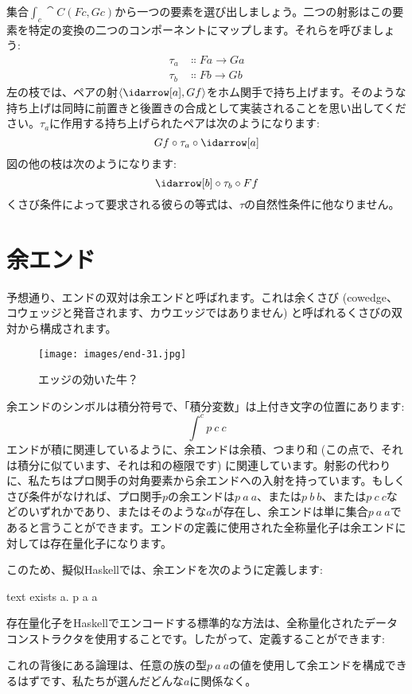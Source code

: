 \noindent
集合$\int_c \cat{C}(F c, G c)$から一つの要素を選び出しましょう。二つの射影はこの要素を特定の変換の二つのコンポーネントにマップします。それらを呼びましょう: 
\begin{align*}
  \tau_a & \Colon F a \to G a \\
  \tau_b & \Colon F b \to G b
\end{align*}
左の枝では、ペアの射$\langle \idarrow[a], G f \rangle$をホム関手で持ち上げます。そのような持ち上げは同時に前置きと後置きの合成として実装されることを思い出してください。$\tau_a$に作用する持ち上げられたペアは次のようになります: 
\[G f \circ \tau_a \circ \idarrow[a]\]
図の他の枝は次のようになります: 
\[\idarrow[b] \circ \tau_b \circ F f\]
くさび条件によって要求される彼らの等式は、$\tau$の自然性条件に他なりません。

\section{余エンド}
予想通り、エンドの双対は余エンドと呼ばれます。これは余くさび (cowedge、コウェッジと発音されます、カウエッジではありません) と呼ばれるくさびの双対から構成されます。

\begin{figure}[H]
  \centering
  \texttt{[image: images/end-31.jpg]}
  \caption{エッジの効いた牛？}
\end{figure}

\noindent
余エンドのシンボルは積分符号で、「積分変数」は上付き文字の位置にあります: 
\[\int^c p\ c\ c\]
エンドが積に関連しているように、余エンドは余積、つまり和 (この点で、それは積分に似ています、それは和の極限です) に関連しています。射影の代わりに、私たちはプロ関手の対角要素から余エンドへの入射を持っています。もしくさび条件がなければ、プロ関手$p$の余エンドは$p\ a\ a$、または$p\ b\ b$、または$p\ c\ c$などのいずれかであり、またはそのような$a$が存在し、余エンドは単に集合$p\ a\ a$であると言うことができます。エンドの定義に使用された全称量化子は余エンドに対しては存在量化子になります。

このため、擬似Haskellでは、余エンドを次のように定義します: 

\begin{snip}{text}
exists a. p a a
\end{snip}
存在量化子をHaskellでエンコードする標準的な方法は、全称量化されたデータコンストラクタを使用することです。したがって、定義することができます: 

これの背後にある論理は、任意の族の型$p\ a\ a$の値を使用して余エンドを構成できるはずです、私たちが選んだどんな$a$に関係なく。

